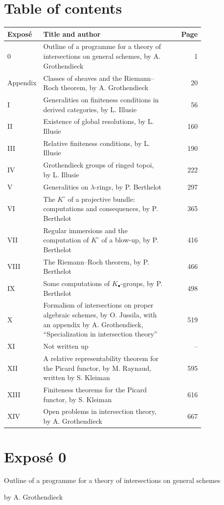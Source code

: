 \documentclass[11pt]{article}
\begin{document}
\section*{Table of contents}
\begin{longtable}{@{}p{0.16\linewidth}p{0.64\linewidth}r@{}}
\toprule
Exposé & Title and author & Page \\
\midrule
0 & Outline of a programme for a theory of intersections on general schemes, by A. Grothendieck & 1 \\
Appendix & Classes of sheaves and the Riemann--Roch theorem, by A. Grothendieck & 20 \\
I & Generalities on finiteness conditions in derived categories, by L. Illusie & 56 \\
II & Existence of global resolutions, by L. Illusie & 160 \\
III & Relative finiteness conditions, by L. Illusie & 190 \\
IV & Grothendieck groups of ringed topoi, by L. Illusie & 222 \\
V & Generalities on $\lambda$-rings, by P. Berthelot & 297 \\
VI & The $K^\circ$ of a projective bundle: computations and consequences, by P. Berthelot & 365 \\
VII & Regular immersions and the computation of $K^\circ$ of a blow-up, by P. Berthelot & 416 \\
VIII & The Riemann--Roch theorem, by P. Berthelot & 466 \\
IX & Some computations of $K_\bullet$-groups, by P. Berthelot & 498 \\
X & Formalism of intersections on proper algebraic schemes, by O. Jussila, with an appendix by A. Grothendieck, ``Specialization in intersection theory'' & 519 \\
XI & Not written up & -- \\
XII & A relative representability theorem for the Picard functor, by M. Raynaud, written by S. Kleiman & 595 \\
XIII & Finiteness theorems for the Picard functor, by S. Kleiman & 616 \\
XIV & Open problems in intersection theory, by A. Grothendieck & 667 \\
\bottomrule
\end{longtable}

\section*{Exposé 0}
\begin{center}
{\large Outline of a programme for a theory of intersections on general schemes}\par
by A. Grothendieck
\end{center}
\end{document}
